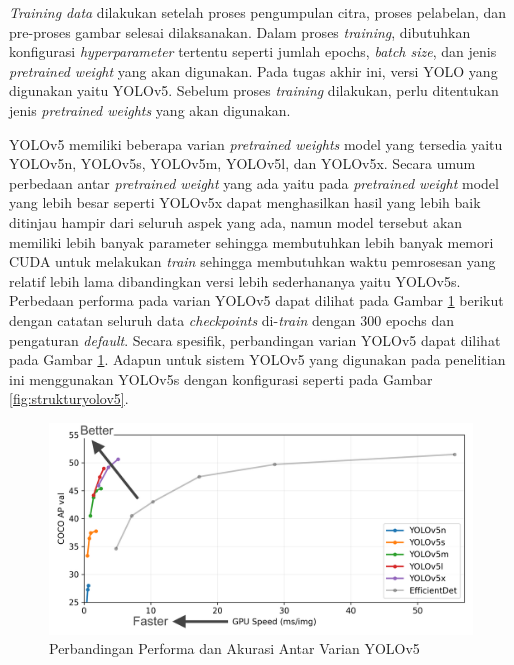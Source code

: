 \textit{Training data} dilakukan setelah proses pengumpulan citra, proses pelabelan, dan pre-proses gambar selesai dilaksanakan. Dalam proses \textit{training}, dibutuhkan konfigurasi \textit{hyperparameter} tertentu seperti jumlah epochs, \textit{batch size}, dan jenis \textit{pretrained weight} yang akan digunakan. Pada tugas akhir ini, versi YOLO yang digunakan yaitu YOLOv5. Sebelum proses \textit{training} dilakukan, perlu ditentukan jenis \textit{pretrained weights} yang akan digunakan. \par

YOLOv5 memiliki beberapa varian \textit{pretrained weights} model yang tersedia yaitu YOLOv5n, YOLOv5s, YOLOv5m, YOLOv5l, dan YOLOv5x. Secara umum perbedaan antar \textit{pretrained weight} yang ada yaitu pada \textit{pretrained weight} model yang lebih besar seperti YOLOv5x dapat menghasilkan hasil yang lebih baik ditinjau hampir dari seluruh aspek yang ada, namun model tersebut akan memiliki lebih banyak parameter sehingga membutuhkan lebih banyak memori CUDA untuk melakukan \textit{train} sehingga membutuhkan waktu pemrosesan yang relatif lebih lama dibandingkan versi lebih sederhananya yaitu YOLOv5s. Perbedaan performa pada varian YOLOv5 dapat dilihat pada Gambar \ref*{fig:yolov5comparison} berikut dengan catatan seluruh data \textit{checkpoints} di-\textit{train} dengan 300 epochs dan pengaturan \textit{default}. Secara spesifik, perbandingan varian YOLOv5 dapat dilihat pada Gambar \ref*{fig:yolov5comparison}. Adapun untuk sistem YOLOv5 yang digunakan pada penelitian ini menggunakan YOLOv5s dengan konfigurasi seperti pada Gambar \ref{fig:strukturyolov5}. \par

\begin{figure}[H]
    \centering
    \includegraphics[scale=0.78]{gambar/yolov5comparison.png}
    \caption{Perbandingan Performa dan Akurasi Antar Varian YOLOv5 \citep*{ultralyticsyolo}}
    \label{fig:yolov5comparison}
\end{figure}

